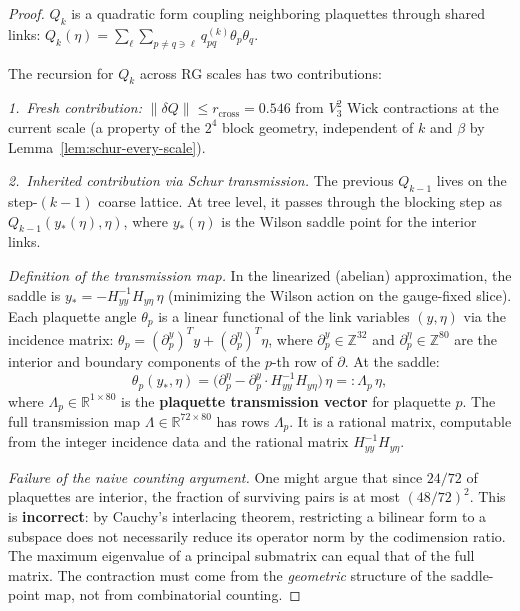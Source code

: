 \documentclass[11pt]{article}
\theoremstyle{definition}
\newcommand{\R}{\mathbb{R}}
\newcommand{\Z}{\mathbb{Z}}
\begin{document}
\begin{proof}
$Q_k$ is a quadratic form coupling neighboring
plaquettes through shared links:
$Q_k(\eta)=\sum_{\ell}\sum_{p\ne q\ni\ell}
q_{pq}^{(k)}\theta_p\theta_q$.

The recursion for $Q_k$ across RG scales has two contributions:

\emph{1.~Fresh contribution:}
$\|\delta Q\|\le r_{\mathrm{cross}}=0.546$ from $V_3^2$ Wick
contractions at the current scale (a property of the
$2^4$ block geometry, independent of $k$ and $\beta$
by Lemma~\ref{lem:schur-every-scale}).

\emph{2.~Inherited contribution via Schur transmission.}
The previous $Q_{k-1}$ lives on the step-$(k{-}1)$ coarse lattice.
At tree level, it passes through the blocking step as
$Q_{k-1}(y_*(\eta),\eta)$, where $y_*(\eta)$ is the
Wilson saddle point for the interior links.

\emph{Definition of the transmission map.}
In the linearized (abelian) approximation, the saddle is
$y_*=-H_{yy}^{-1}H_{y\eta}\,\eta$ (minimizing the Wilson
action on the gauge-fixed slice).  Each plaquette angle
$\theta_p$ is a linear functional of the link variables
$(y,\eta)$ via the incidence matrix:
$\theta_p=(\partial_p^y)^T y+(\partial_p^\eta)^T\eta$,
where $\partial_p^y\in\Z^{32}$ and $\partial_p^\eta\in\Z^{80}$
are the interior and boundary components of the $p$-th row
of $\partial$.
At the saddle:
\begin{equation}\label{eq:transmission}
\theta_p(y_*,\eta)
=\bigl(\partial_p^\eta-\partial_p^y\cdot
H_{yy}^{-1}H_{y\eta}\bigr)\,\eta
=:\Lambda_p\,\eta,
\end{equation}
where $\Lambda_p\in\R^{1\times 80}$ is the
\textbf{plaquette transmission vector} for plaquette $p$.
The full transmission map $\Lambda\in\R^{72\times 80}$ has
rows $\Lambda_p$.  It is a rational matrix, computable from
the integer incidence data and the rational matrix
$H_{yy}^{-1}H_{y\eta}$.

\emph{Failure of the naive counting argument.}
One might argue that since $24/72$ of plaquettes are interior,
the fraction of surviving pairs is at most $(48/72)^2$.
This is \textbf{incorrect}: by Cauchy's interlacing theorem,
restricting a bilinear form to a subspace does not
necessarily reduce its operator norm by the codimension ratio.
The maximum eigenvalue of a principal submatrix can equal
that of the full matrix.  The contraction must come from the
\emph{geometric} structure of the saddle-point map, not from
combinatorial counting.


\end{proof}
\end{document}
